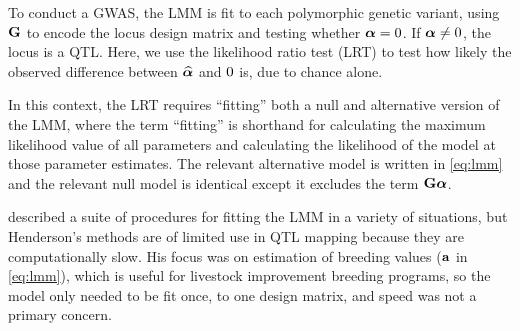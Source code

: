 To conduct a GWAS, the LMM is fit to each polymorphic genetic variant, using $\mathbf{G}$ to encode the locus design matrix and testing whether $\boldsymbol{\alpha} = \boldmath{0}$.
If $\boldsymbol{\alpha} \neq \boldmath{0}$, the locus is a QTL.
Here, we use the likelihood ratio test (LRT) to test how likely the observed difference between $\widehat{\boldsymbol{\alpha}}$ and $\boldmath{0}$ is, due to chance alone.

In this context, the LRT requires ``fitting'' both a null and alternative version of the LMM, where the term ``fitting'' is shorthand for calculating the maximum likelihood value of all parameters and calculating the likelihood of the model at those parameter estimates.
The relevant alternative model is written in \cref{eq:lmm} and the relevant null model is identical except it excludes the term $\mathbf{G}\boldsymbol{\alpha}$.

\citet{Henderson1984} described a suite of procedures for fitting the LMM in a variety of situations, but Henderson's methods are of limited use in QTL mapping because they are computationally slow.
His focus was on estimation of breeding values ($\mathbf{a}$ in \cref{eq:lmm}), which is useful for livestock improvement breeding programs, so the model only needed to be fit once, to one design matrix, and speed was not a primary concern.










